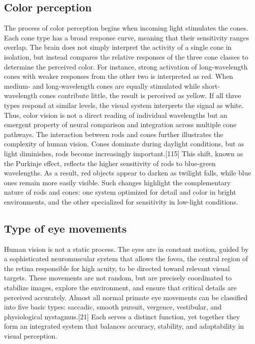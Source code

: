 \documentclass[12pt]{report}
\begin{document}
\subsection{Color perception}

The process of color perception begins when incoming light stimulates the cones.
Each cone type has a broad response curve, meaning that their sensitivity ranges overlap. 
The brain does not simply interpret the activity of a single cone in isolation, but instead compares the relative responses of the three cone classes to determine the perceived color. 
For instance, strong activation of long-wavelength cones with weaker responses from the other two is interpreted as red. 
When medium- and long-wavelength cones are equally stimulated while short-wavelength cones contribute little, the result is perceived as yellow. 
If all three types respond at similar levels, the visual system interprets the signal as white. 
Thus, color vision is not a direct reading of individual wavelengths but an emergent property of neural comparison and integration across multiple cone pathways.
The interaction between rods and cones further illustrates the complexity of human vision.
Cones dominate during daylight conditions, but as light diminishes, rods become increasingly important.[115]
This shift, known as the Purkinje effect, reflects the higher sensitivity of rods to blue-green wavelengths.
As a result, red objects appear to darken as twilight falls, while blue ones remain more easily visible. 
Such changes highlight the complementary nature of rods and cones: one system optimized for detail and color in bright environments, and the other specialized for sensitivity in low-light conditions.

\subsection{Type of eye movements}

Human vision is not a static process. 
The eyes are in constant motion, guided by a sophisticated neuromuscular system that allows the fovea, the central region of the retina responsible for high acuity, to be directed toward relevant visual targets.
These movements are not random, but are precisely coordinated to stabilize images, explore the environment, and ensure that critical details are perceived accurately.
Almost all normal primate eye movements can be classified into five basic types: saccadic, smooth pursuit, vergence, vestibular, and physiological nystagmus.[21]
Each serves a distinct function, yet together they form an integrated system that balances accuracy, stability, and adaptability in visual perception.
\end{document}
